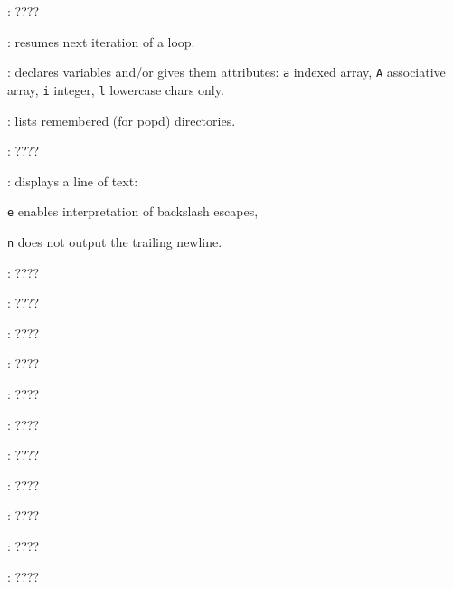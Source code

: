 \begin{compactenum}
\item [\symbolbash] : \dotfill ????

\item [\symbolbash] : resumes next iteration of a loop.

\item [\symbolbash] : declares variables and/or gives them attributes: \texttt{a} indexed array, \texttt{A} associative array, \texttt{i} integer, \texttt{l} lowercase chars only.

\item [\symbolbash] : lists remembered (for popd) directories.

\item [\symbolbash] : \dotfill ????

\item [\symbolbash] : displays a line of text:
\item [\texttt{e}] enables interpretation of backslash escapes,
\item [\texttt{n}] does not output the trailing newline.

\item [\symbolbash] : \dotfill ????

\item [\symbolbash] : \dotfill ????

\item [\symbolbash] : \dotfill ????

\item [\symbolbash] : \dotfill ????

\item [\symbolbash] : \dotfill ????

\item [\symbolbash] : \dotfill ????

\item [\symbolbash] : \dotfill ????

\item [\symbolbash] : \dotfill ????

\item [\symbolbash] : \dotfill ????

\item [\symbolbash] : \dotfill ????

\item [\symbolbash] : \dotfill ????


\end{compactenum}
